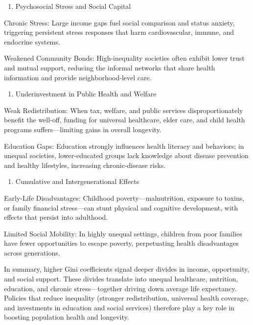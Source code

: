 \documentclass[
  11pt,
]{article}
\providecommand{\tightlist}{%
  \setlength{\itemsep}{0pt}\setlength{\parskip}{0pt}}\usepackage{longtable,booktabs,array}
\begin{document}
\begin{enumerate}
\def\labelenumi{\arabic{enumi}.}
\setcounter{enumi}{1}
\tightlist
\item
  Psychosocial Stress and Social Capital
\end{enumerate}

Chronic Stress: Large income gaps fuel social comparison and status
anxiety, triggering persistent stress responses that harm
cardiovascular, immune, and endocrine systems.

Weakened Community Bonds: High-inequality societies often exhibit lower
trust and mutual support, reducing the informal networks that share
health information and provide neighborhood‐level care.

\begin{enumerate}
\def\labelenumi{\arabic{enumi}.}
\setcounter{enumi}{2}
\tightlist
\item
  Underinvestment in Public Health and Welfare
\end{enumerate}

Weak Redistribution: When tax, welfare, and public services
disproportionately benefit the well-off, funding for universal
healthcare, elder care, and child health programs suffers---limiting
gains in overall longevity.

Education Gaps: Education strongly influences health literacy and
behaviors; in unequal societies, lower-educated groups lack knowledge
about disease prevention and healthy lifestyles, increasing
chronic‐disease risks.

\begin{enumerate}
\def\labelenumi{\arabic{enumi}.}
\setcounter{enumi}{3}
\tightlist
\item
  Cumulative and Intergenerational Effects
\end{enumerate}

Early-Life Disadvantages: Childhood poverty---malnutrition, exposure to
toxins, or family financial stress---can stunt physical and cognitive
development, with effects that persist into adulthood.

Limited Social Mobility: In highly unequal settings, children from poor
families have fewer opportunities to escape poverty, perpetuating health
disadvantages across generations.

In summary, higher Gini coefficients signal deeper divides in income,
opportunity, and social support. These divides translate into unequal
healthcare, nutrition, education, and chronic stress---together driving
down average life expectancy. Policies that reduce inequality (stronger
redistribution, universal health coverage, and investments in education
and social services) therefore play a key role in boosting population
health and longevity.
\end{document}
